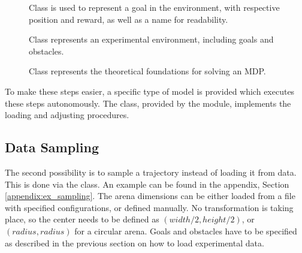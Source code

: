\begin{figure}
	\centering
	\caption{Class  is used to represent a goal in the environment, with respective position and reward, as well as a name for readability.}
	\label{fig:uml:goal}
	\caption{Class  represents an experimental environment, including goals and obstacles.}
	\label{fig:uml:environment}
	
	\caption{Class  represents the theoretical foundations for solving an MDP.}
	\label{fig:uml:mdp}
\end{figure}

To make these steps easier, a specific type of model is provided which executes these steps autonomously.
The  class, provided by the  module, implements the loading and adjusting procedures.

\subsection{Data Sampling}

The second possibility is to sample a trajectory instead of loading it from data.
This is done via the  class.
An example can be found in the appendix, Section  \ref{appendix:ex_sampling}.
The arena dimensions can be either loaded from a file with specified configurations, or defined manually.
No transformation is taking place, so the center needs to be defined as $(width/2, height/2)$, or $(radius, radius)$ for a circular arena.
Goals and obstacles have to be specified as described in the previous section on how to load experimental data.

